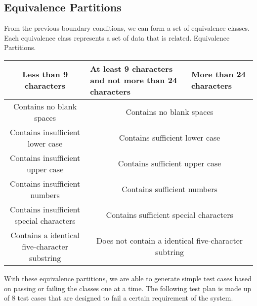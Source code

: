 \documentclass[12pt,letterpaper]{article}
\begin{document}
\subsection{Equivalence Partitions}

From the previous boundary conditions, we can form a set of equivalence classes. Each equivalence
class represents a set of data that is related.
\centering Equivalence Partitions.

\begin{center}

    
  \begin{tabular}{||c|m{4cm}|m{5cm}||}
  \hline
  Less than 9 characters & At least 9 characters and not more than 24
  characters & More than 24 characters \\
  
  \hline \hline
  \multicolumn{1}{||c|}{Contains no blank spaces} & \multicolumn{2}{c||}{Contains no blank spaces} \\
  
  \hline \hline
  \multicolumn{1}{||c|}{Contains insufficient lower case} 
  & \multicolumn{2}{c||}{Contains sufficient lower case} \\
    
  \hline \hline
  \multicolumn{1}{||c|}{Contains insufficient upper case} 
  & \multicolumn{2}{c||}{Contains sufficient upper case} \\
  
  \hline \hline
  \multicolumn{1}{||c|}{Contains insufficient numbers} 
  & \multicolumn{2}{c||}{Contains sufficient numbers} \\
    
  \hline \hline
  \multicolumn{1}{||c|}{Contains insufficient special characters} 
  & \multicolumn{2}{c||}{Contains sufficient special characters} \\
  
  \hline \hline
  \multicolumn{1}{||c|}{Contains a identical five-character substring}
  & \multicolumn{2}{c||}{Does not contain a identical five-character subtring} \\
  \hline
  \end{tabular}
\end{center}


With these equivalence partitions, we are able to generate simple test cases
based on passing or failing the classes one at a time. The following test plan
is made up of 8 test cases that are designed to fail a certain requirement of
the system.
\newline
\end{document}
